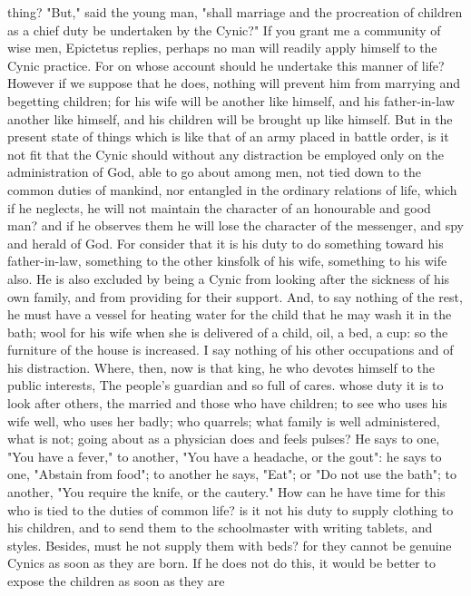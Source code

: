 \documentclass[a4paper]{article}
\begin{document}
thing?
    "But," said the young man, "shall marriage and the procreation of children
as a chief duty be undertaken by the Cynic?" If you grant me a community of
wise men, Epictetus replies, perhaps no man will readily apply himself to the
Cynic practice. For on whose account should he undertake this manner of life?
However if we suppose that he does, nothing will prevent him from marrying and
begetting children; for his wife will be another like himself, and his
father-in-law another like himself, and his children will be brought up like
himself. But in the present state of things which is like that of an army
placed in battle order, is it not fit that the Cynic should without any
distraction be employed only on the administration of God, able to go about
among men, not tied down to the common duties of mankind, nor entangled in the
ordinary relations of life, which if he neglects, he will not maintain the
character of an honourable and good man? and if he observes them he will lose
the character of the messenger, and spy and herald of God. For consider that it
is his duty to do something toward his father-in-law, something to the other
kinsfolk of his wife, something to his wife also. He is also excluded by being
a Cynic from looking after the sickness of his own family, and from providing
for their support. And, to say nothing of the rest, he must have a vessel for
heating water for the child that he may wash it in the bath; wool for his wife
when she is delivered of a child, oil, a bed, a cup: so the furniture of the
house is increased. I say nothing of his other occupations and of his
distraction. Where, then, now is that king, he who devotes himself to the
public interests,
       The people's guardian and so full of cares.
whose duty it is to look after others, the married and those who have children;
to see who uses his wife well, who uses her badly; who quarrels; what family is
well administered, what is not; going about as a physician does and feels
pulses? He says to one, "You have a fever," to another, "You have a headache,
or the gout": he says to one, "Abstain from food"; to another he says, "Eat";
or "Do not use the bath"; to another, "You require the knife, or the cautery."
How can he have time for this who is tied to the duties of common life? is it
not his duty to supply clothing to his children, and to send them to the
schoolmaster with writing tablets, and styles. Besides, must he not supply them
with beds? for they cannot be genuine Cynics as soon as they are born. If he
does not do this, it would be better to expose the children as soon as they are
\end{document}
